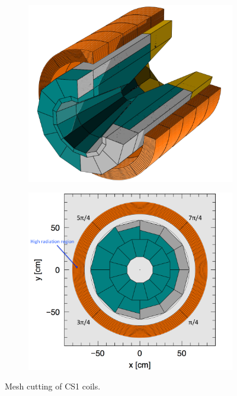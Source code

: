  \begin{figure}[H]
  \begin{subfigure}{0.25\textwidth}
   \centering
   \includegraphics[scale=0.23]{chapter5/fig/heatgeo1.pdf}
  \end{subfigure}
  \hspace{0.2\textwidth}
  \begin{subfigure}{0.27\textwidth}
   \centering
   \includegraphics[scale=0.23]{chapter5/fig/heatgeo2.pdf}
  \end{subfigure}
  \caption{Mesh cutting of CS1 coils.}
  \label{4geoh}
 \end{figure}
